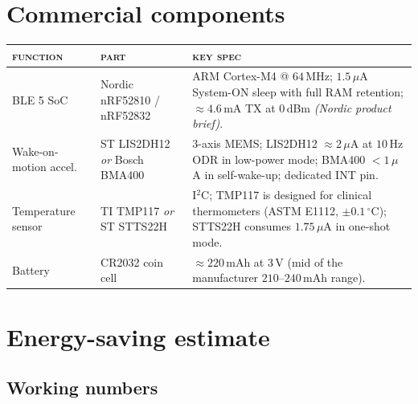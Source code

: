 \documentclass[11pt,a4paper]{article}
\begin{document}
\newpage
\section{Commercial components}

\begin{tabularx}{\linewidth}{@{} l l Y @{}}
\toprule
\textsc{function} & \textsc{part} & \textsc{key spec} \\
\midrule
BLE 5 SoC                & Nordic \textsf{nRF52810} / \textsf{nRF52832}
& ARM Cortex-M4 @ $64\,$MHz; $1.5\,\mu$A System-ON sleep with full
  RAM retention; $\approx 4.6\,$mA TX at $0\,$dBm
  \emph{(Nordic product brief)}. \\
\addlinespace[2pt]
Wake-on-motion accel.\   & ST \textsf{LIS2DH12} \emph{or} Bosch \textsf{BMA400}
& 3-axis MEMS; LIS2DH12 $\approx 2\,\mu$A at $10\,$Hz ODR in
  low-power mode; BMA400 $<1\,\mu$A in self-wake-up; dedicated INT
  pin. \\
\addlinespace[2pt]
Temperature sensor       & TI \textsf{TMP117} \emph{or} ST \textsf{STTS22H}
& I$^2$C; TMP117 is designed for clinical thermometers (ASTM E1112,
  $\pm 0.1\,^\circ$C); STTS22H consumes $1.75\,\mu$A in one-shot mode. \\
\addlinespace[2pt]
Battery                  & \textsf{CR2032} coin cell
& $\approx 220\,$mAh at $3\,$V (mid of the manufacturer
  $210$--$240\,$mAh range). \\
\bottomrule
\end{tabularx}

\section{Energy-saving estimate}

\subsection*{Working numbers}
\end{document}
